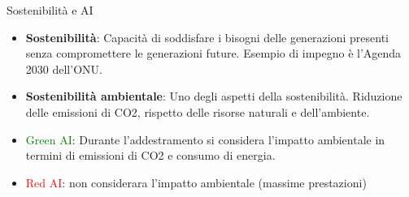 \begin{frame}{Sostenibilità e AI} 
        \begin{itemize}
                \item {} \textbf{Sostenibilità}: Capacità di soddisfare i bisogni delle generazioni presenti senza compromettere le generazioni future. Esempio di impegno è l'Agenda 2030 dell'ONU.
                \item {} \textbf{Sostenibilità ambientale}: Uno degli aspetti della sostenibilità. Riduzione delle emissioni di CO2, rispetto delle risorse naturali e dell'ambiente.
                \item {} \textcolor{green}{Green AI}: Durante l'addestramento si considera l'impatto ambientale in termini di emissioni di CO2 e consumo di energia.
                \item {} \textcolor{red}{Red AI}: non considerara l'impatto ambientale (massime prestazioni)
        \end{itemize}
\end{frame}

